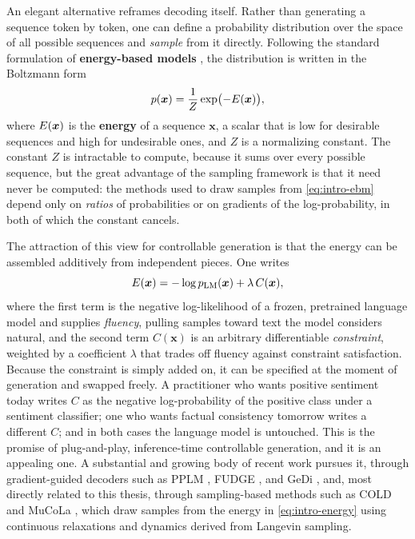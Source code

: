 An elegant alternative reframes decoding itself. Rather than generating a sequence token by token, one can define a probability distribution over the space of all possible sequences and \emph{sample} from it directly. Following the standard formulation of \textbf{energy-based models} \citep{lecun2006tutorial, hinton2002training}, the distribution is written in the Boltzmann form
\begin{equation}
    p(\bm{x}) = \frac{1}{Z}\exp\bigl(-E(\bm{x})\bigr),
    \label{eq:intro-ebm}
\end{equation}
where $E(\bm{x})$ is the \textbf{energy} of a sequence $\bm{x}$, a scalar that is low for desirable sequences and high for undesirable ones, and $Z$ is a normalizing constant. The constant $Z$ is intractable to compute, because it sums over every possible sequence, but the great advantage of the sampling framework is that it need never be computed: the methods used to draw samples from \eqref{eq:intro-ebm} depend only on \emph{ratios} of probabilities or on gradients of the log-probability, in both of which the constant cancels.

The attraction of this view for controllable generation is that the energy can be assembled additively from independent pieces. One writes
\begin{equation}
    E(\bm{x}) = -\log p_{\text{LM}}(\bm{x}) + \lambda\, C(\bm{x}),
    \label{eq:intro-energy}
\end{equation}
where the first term is the negative log-likelihood of a frozen, pretrained language model and supplies \emph{fluency}, pulling samples toward text the model considers natural, and the second term $C(\bm{x})$ is an arbitrary differentiable \emph{constraint}, weighted by a coefficient $\lambda$ that trades off fluency against constraint satisfaction. Because the constraint is simply added on, it can be specified at the moment of generation and swapped freely. A practitioner who wants positive sentiment today writes $C$ as the negative log-probability of the positive class under a sentiment classifier; one who wants factual consistency tomorrow writes a different $C$; and in both cases the language model is untouched. This is the promise of plug-and-play, inference-time controllable generation, and it is an appealing one. A substantial and growing body of recent work pursues it, through gradient-guided decoders such as PPLM \citep{dathathri2020plug}, FUDGE \citep{yang2021fudge}, and GeDi \citep{krause2021gedi}, and, most directly related to this thesis, through sampling-based methods such as COLD \citep{qin2022cold} and MuCoLa \citep{kumar2022gradient}, which draw samples from the energy in \eqref{eq:intro-energy} using continuous relaxations and dynamics derived from Langevin sampling.

